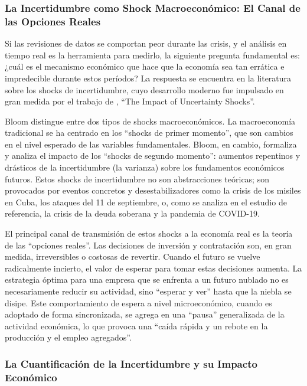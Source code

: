 \documentclass{article}
\begin{document}
\subsubsection{La Incertidumbre como Shock Macroeconómico: El Canal de las Opciones Reales}

Si las revisiones de datos se comportan peor durante las crisis, y el análisis en tiempo real es la herramienta para medirlo, la siguiente pregunta fundamental es: ¿cuál es el mecanismo económico que hace que la economía sea tan errática e impredecible durante estos períodos? La respuesta se encuentra en la literatura sobre los shocks de incertidumbre, cuyo desarrollo moderno fue impulsado en gran medida por el trabajo de \citet{bloom2009}, ``The Impact of Uncertainty Shocks''.

Bloom distingue entre dos tipos de shocks macroeconómicos. La macroeconomía tradicional se ha centrado en los ``shocks de primer momento'', que son cambios en el nivel esperado de las variables fundamentales. Bloom, en cambio, formaliza y analiza el impacto de los ``shocks de segundo momento'': aumentos repentinos y drásticos de la incertidumbre (la varianza) sobre los fundamentos económicos futuros. Estos shocks de incertidumbre no son abstracciones teóricas; son provocados por eventos concretos y desestabilizadores como la crisis de los misiles en Cuba, los ataques del 11 de septiembre, o, como se analiza en el estudio de referencia, la crisis de la deuda soberana y la pandemia de COVID-19.

El principal canal de transmisión de estos shocks a la economía real es la teoría de las ``opciones reales''. Las decisiones de inversión y contratación son, en gran medida, irreversibles o costosas de revertir. Cuando el futuro se vuelve radicalmente incierto, el valor de esperar para tomar estas decisiones aumenta. La estrategia óptima para una empresa que se enfrenta a un futuro nublado no es necesariamente reducir su actividad, sino ``esperar y ver'' hasta que la niebla se disipe. Este comportamiento de espera a nivel microeconómico, cuando es adoptado de forma sincronizada, se agrega en una ``pausa'' generalizada de la actividad económica, lo que provoca una ``caída rápida y un rebote en la producción y el empleo agregados''.

\subsubsection{La Cuantificación de la Incertidumbre y su Impacto Económico}
\end{document}

